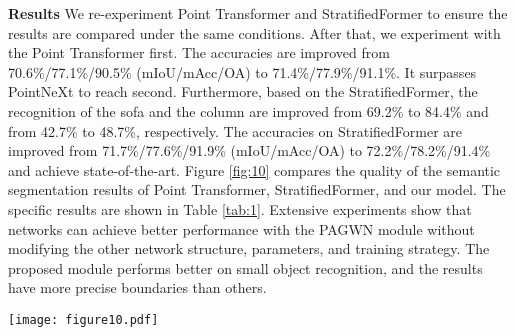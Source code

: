 \documentclass[10pt,twocolumn,letterpaper]{article}
\begin{document}
        \textbf{Results}  We re-experiment Point Transformer and StratifiedFormer to ensure the results are compared under the same conditions.
        After that, we experiment with the Point Transformer first.
        The accuracies are improved from 70.6\%/77.1\%/90.5\% (mIoU/mAcc/OA) to 71.4\%/77.9\%/91.1\%.
        It surpasses PointNeXt \cite{45https://doi.org/10.48550/arxiv.2206.04670} to reach second.
        Furthermore, based on the StratifiedFormer, the recognition of the sofa and the column are improved from 69.2\% to 84.4\% and from 42.7\% to 48.7\%, respectively.
        The accuracies on StratifiedFormer are improved from 71.7\%/77.6\%/91.9\% (mIoU/mAcc/OA) to 72.2\%/78.2\%/91.4\% and achieve state-of-the-art.
        Figure \ref{fig:10} compares the quality of the semantic segmentation results of Point Transformer, StratifiedFormer, and our model.
        The specific results are shown in Table \ref{tab:1}.
        Extensive experiments show that networks can achieve better performance with the PAGWN module without modifying the other network structure, parameters, and training strategy.
        The proposed module performs better on small object recognition, and the results have more precise boundaries than others.
        \begin{figure*}[!htb]
            \centering
            \texttt{[image: figure10.pdf]}
            \caption{Quality comparison on three different scenes of S3DIS (Area 5). There are thirteen different kinds of categories colorized by different colors. We use black boxes to highlight where our model is better than the original. The proposed module performs better on small object recognition, and the results have more precise boundaries than others. Only our proposed module can locate the clock, cabinet, and bookcase in all tested networks. (a) Point clouds with coordinates and RGB features. (b) Ground truth Semantic labels. (c) Point Transformer. (d) Point Transformer with PAGWN. (e) StratifiedFormer. (f) StratifiedFormer with PAGWN.}
            \label{fig:10}
            \end{figure*}
\end{document}
